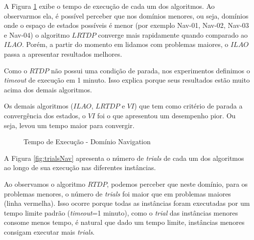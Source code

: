 A Figura \ref{fig:timeNav} exibe o tempo de execução de cada um dos algoritmos. Ao observarmos ela, é possível perceber que nos domínios menores, ou seja, domínios onde o espaço de estados possíveis é menor (por exemplo Nav-01, Nav-02, Nav-03 e Nav-04) o algoritmo $LRTDP$ converge mais rapidamente quando comparado ao $ILAO$. Porém, a partir do momento em lidamos com problemas maiores, o $ILAO$ passa a apresentar resultados melhores. 

Como o $RTDP$ não possui uma condição de parada, nos experimentos definimos o \textit{timeout} de execução em 1 minuto. Isso explica porque seus resultados estão muito acima dos demais algoritmos.

Os demais algoritmos ($ILAO$, $LRTDP$ e $VI$) que tem como critério de parada a convergência dos estados, o $VI$ foi o que apresentou um desempenho pior. Ou seja, levou um tempo maior para convergir.

\begin{figure}[H]
\centering
{}
\caption{Tempo de Execução - Domínio Navigation}
\label{fig:timeNav}
\end{figure}


A Figura \ref{fig:trialsNav} apresenta o número de \textit{trials} de cada um dos algoritmos ao longo de sua execução nas diferentes instâncias.

Ao observamos o algoritmo $RTDP$, podemos perceber que neste domínio, para os problemas menores, o número de \textit{trials} foi maior que em problemas maiores (linha vermelha). Isso ocorre porque todas as instâncias foram executadas por um tempo limite padrão (\textit{timeout}=1 minuto), como o \textit{trial} das instâncias menores consome menos tempo, é natural que dado um tempo limite, instâncias menores consigam executar mais \textit{trials}.


